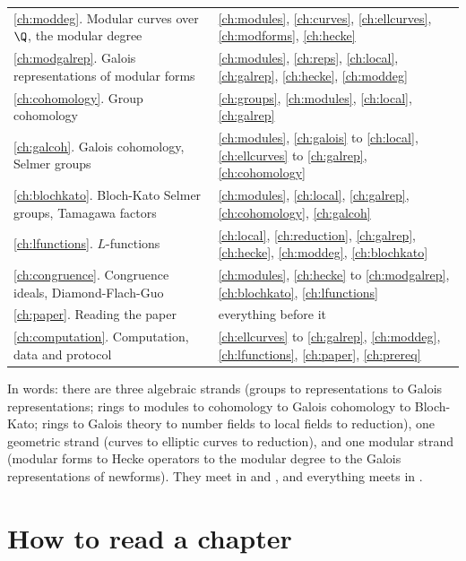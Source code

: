\begin{center}
\begin{tabular}{@{}p{}p{}@{}}
\ref{ch:moddeg}. Modular curves over $\Q$, the modular degree & \ref{ch:modules}, \ref{ch:curves}, \ref{ch:ellcurves}, \ref{ch:modforms}, \ref{ch:hecke} \\
\ref{ch:modgalrep}. Galois representations of modular forms & \ref{ch:modules}, \ref{ch:reps}, \ref{ch:local}, \ref{ch:galrep}, \ref{ch:hecke}, \ref{ch:moddeg} \\
\ref{ch:cohomology}. Group cohomology & \ref{ch:groups}, \ref{ch:modules}, \ref{ch:local}, \ref{ch:galrep} \\
\ref{ch:galcoh}. Galois cohomology, Selmer groups & \ref{ch:modules}, \ref{ch:galois} to \ref{ch:local}, \ref{ch:ellcurves} to \ref{ch:galrep}, \ref{ch:cohomology} \\
\ref{ch:blochkato}. Bloch-Kato Selmer groups, Tamagawa factors & \ref{ch:modules}, \ref{ch:local}, \ref{ch:galrep}, \ref{ch:cohomology}, \ref{ch:galcoh} \\
\ref{ch:lfunctions}. $L$-functions & \ref{ch:local}, \ref{ch:reduction}, \ref{ch:galrep}, \ref{ch:hecke}, \ref{ch:moddeg}, \ref{ch:blochkato} \\
\ref{ch:congruence}. Congruence ideals, Diamond-Flach-Guo & \ref{ch:modules}, \ref{ch:hecke} to \ref{ch:modgalrep}, \ref{ch:blochkato}, \ref{ch:lfunctions} \\
\ref{ch:paper}. Reading the paper & everything before it \\
\ref{ch:computation}. Computation, data and protocol & \ref{ch:ellcurves} to \ref{ch:galrep}, \ref{ch:moddeg}, \ref{ch:lfunctions}, \ref{ch:paper}, \ref{ch:prereq} \\
\bottomrule
\end{tabular}
\end{center}

In words: there are three algebraic strands (groups to representations to Galois representations;
rings to modules to cohomology to Galois cohomology to Bloch-Kato; rings to Galois theory to number
fields to local fields to reduction), one geometric strand (curves to elliptic curves to reduction),
and one modular strand (modular forms to Hecke operators to the modular degree to the Galois
representations of newforms). They meet in  and , and
everything meets in .

\section*{How to read a chapter}

